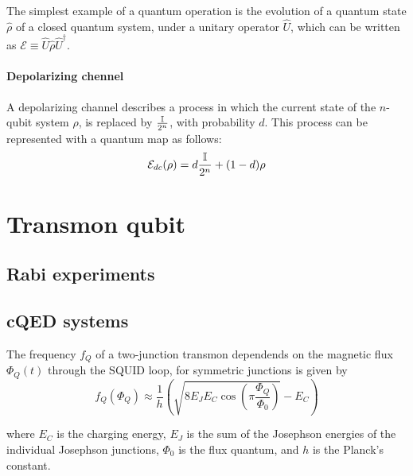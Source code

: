 The simplest example of a quantum operation is the evolution of a quantum state $\hat{\rho}$ of a closed quantum system, under a unitary operator $\hat{U}$, which can be written as $\mathcal{E} \equiv \hat{U} \hat{\rho} \hat{U}^{\dagger}$.

\paragraph{Depolarizing chennel}
A depolarizing channel describes a process in which the current state of the $n$-qubit system $\rho$, is replaced by $\frac{\mathbb{I}}{2^n}$, with probability $d$. This process can be represented with a quantum map as follows:
\begin{equation}
    \mathcal{E}_{dc}(\rho) = d\frac{\mathbb{I}}{2^n}+(1-d)\rho\label{eq:depolarizing_channel}
\end{equation} 

\section{Transmon qubit}

\subsection{Rabi experiments}

\subsection{cQED systems} \label{sec:cQED}

The frequency $f_Q$ of a two-junction transmon dependends on the magnetic flux $\Phi_Q(t)$ through the SQUID loop, for symmetric junctions is given by\cite{TransmonPaper}
\begin{equation}\label{eq:freqdepndenceonflux}
    f_Q(\Phi_Q) \approx \frac{1}{h} \left( \sqrt{8E_J E_C \cos\left(\pi \frac{\Phi_Q}{\Phi_0} \right)} - E_C \right)    
\end{equation}

where $E_C$ is the charging energy, $E_J$ is the sum of the Josephson energies of the individual Josephson junctions, $\Phi_0$ is the flux quantum, and $h$ is the Planck's constant.